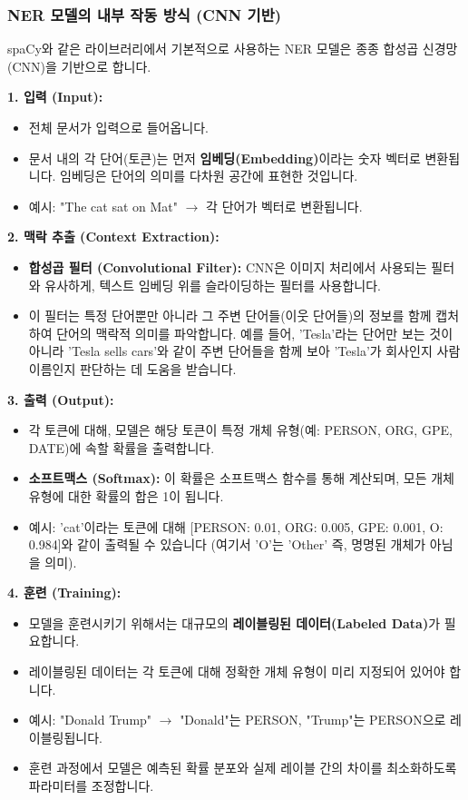 \documentclass[11pt,a4paper]{article}
\theoremstyle{definition}
\begin{document}
\newpage
\subsubsection*{NER 모델의 내부 작동 방식 (CNN 기반)}
spaCy와 같은 라이브러리에서 기본적으로 사용하는 NER 모델은 종종 합성곱 신경망(CNN)을 기반으로 합니다.

\textbf{1. 입력 (Input):}
\begin{itemize}
    \item 전체 문서가 입력으로 들어옵니다.
    \item 문서 내의 각 단어(토큰)는 먼저 \textbf{임베딩(Embedding)}이라는 숫자 벡터로 변환됩니다. 임베딩은 단어의 의미를 다차원 공간에 표현한 것입니다.
    \item 예시: "The cat sat on Mat" $\rightarrow$ 각 단어가 벡터로 변환됩니다.
\end{itemize}

\textbf{2. 맥락 추출 (Context Extraction):}
\begin{itemize}
    \item \textbf{합성곱 필터 (Convolutional Filter):} CNN은 이미지 처리에서 사용되는 필터와 유사하게, 텍스트 임베딩 위를 슬라이딩하는 필터를 사용합니다.
    \item 이 필터는 특정 단어뿐만 아니라 그 주변 단어들(이웃 단어들)의 정보를 함께 캡처하여 단어의 맥락적 의미를 파악합니다. 예를 들어, 'Tesla'라는 단어만 보는 것이 아니라 'Tesla sells cars'와 같이 주변 단어들을 함께 보아 'Tesla'가 회사인지 사람 이름인지 판단하는 데 도움을 받습니다.
\end{itemize}

\textbf{3. 출력 (Output):}
\begin{itemize}
    \item 각 토큰에 대해, 모델은 해당 토큰이 특정 개체 유형(예: PERSON, ORG, GPE, DATE)에 속할 확률을 출력합니다.
    \item \textbf{소프트맥스 (Softmax):} 이 확률은 소프트맥스 함수를 통해 계산되며, 모든 개체 유형에 대한 확률의 합은 1이 됩니다.
    \item 예시: 'cat'이라는 토큰에 대해 [PERSON: 0.01, ORG: 0.005, GPE: 0.001, O: 0.984]와 같이 출력될 수 있습니다 (여기서 'O'는 'Other' 즉, 명명된 개체가 아님을 의미).
\end{itemize}

\textbf{4. 훈련 (Training):}
\begin{itemize}
    \item 모델을 훈련시키기 위해서는 대규모의 \textbf{레이블링된 데이터(Labeled Data)}가 필요합니다.
    \item 레이블링된 데이터는 각 토큰에 대해 정확한 개체 유형이 미리 지정되어 있어야 합니다.
    \item 예시: "Donald Trump" $\rightarrow$ "Donald"는 PERSON, "Trump"는 PERSON으로 레이블링됩니다.
    \item 훈련 과정에서 모델은 예측된 확률 분포와 실제 레이블 간의 차이를 최소화하도록 파라미터를 조정합니다.
\end{itemize}
\end{document}
